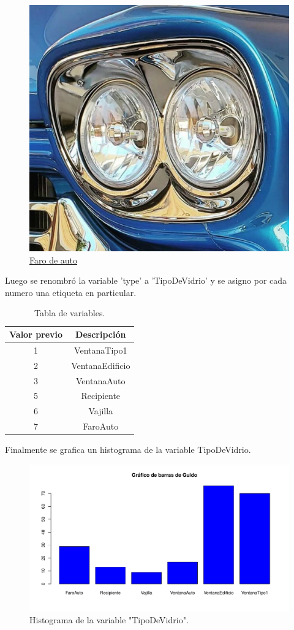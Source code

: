 \begin{figure}[H]
	\centering
	\includegraphics[width=.5\linewidth]{../Ejercicio-2/ImagenesEjercicio2/headlightGlass.jpg}
	\caption{\href{https://www.octanelighting.com/5-34-crystal-clear-metal-glass-headlight-led-set-033-034-g5-led-2.html}{Faro de auto}}	
	\label{fig:pic5}
\end{figure}
Luego se renombró la variable 'type' a 'TipoDeVidrio' y se asigno por cada numero una etiqueta en particular.

\begin{table}[H]
\centering
\begin{tabular}{|c|c|}
\hline
\textbf{Valor previo} & \textbf{Descripción} \\ \hline
1                     & VentanaTipo1         \\ \hline
2                     & VentanaEdificio      \\ \hline
3                     & VentanaAuto          \\ \hline
5                     & Recipiente           \\ \hline
6                     & Vajilla              \\ \hline
7                     & FaroAuto             \\ \hline
\end{tabular}

\caption{Tabla de variables.}
\label{tab:newnames}
\end{table}


Finalmente se grafica un histograma de la variable TipoDeVidrio.

\begin{figure}[H]
	\centering
	\includegraphics[width=\linewidth]{../Ejercicio-2/ImagenesEjercicio2/TipoDeVidrio.pdf}
	\caption{Histograma de la variable "TipoDeVidrio".}	
	\label{fig:tipodevdrio}
\end{figure}
